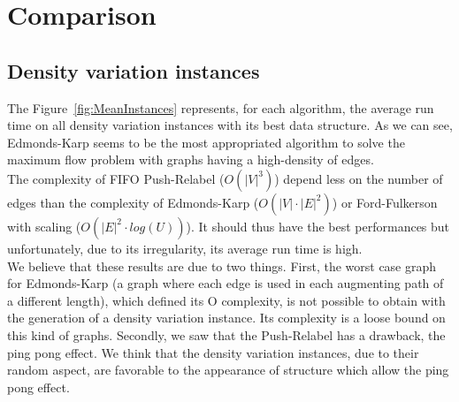 

\section{Comparison}


\subsection{Density variation instances}
The Figure~\ref{fig:MeanInstances} represents, for each algorithm, the average run time on all density variation instances with its best data structure. As we can see, Edmonds-Karp seems to be the most appropriated algorithm to solve the maximum flow problem with graphs having a high-density of edges. \\

The complexity of FIFO Push-Relabel ($O(|V|^3)$) depend less on the number of edges than the complexity of Edmonds-Karp ($O(|V|\cdot |E|^2)$) or Ford-Fulkerson with scaling ($O(|E|^2 \cdot log(U))$). It should thus have the best performances but unfortunately, due to its irregularity, its average run time is high. \\

We believe that these results are due to two things. First, the worst case graph for Edmonds-Karp (a graph where each edge is used in each augmenting path of a different length), which defined its O complexity, is not possible to obtain with the generation of a density variation instance. Its complexity is a loose bound on this kind of graphs. Secondly, we saw that the Push-Relabel has a drawback, the ping pong effect. We think that the density variation instances, due to their random aspect, are favorable to the appearance of structure which allow the ping pong effect.

